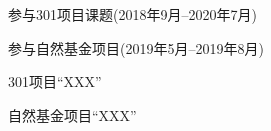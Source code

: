 \begin{projects}
	\item 参与301项目课题(2018年9月--2020年7月)
	\item 参与自然基金项目(2019年5月--2019年8月)
\end{projects}

\begin{projects*}
	\item 301项目“XXX”
	\item 自然基金项目“XXX”
\end{projects*}